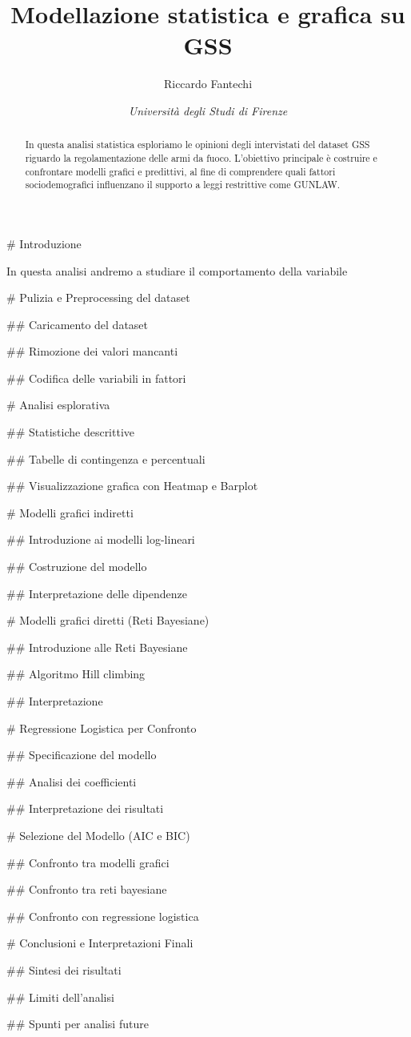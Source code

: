 \documentclass[
  11pt,
]{article}
\title{Modellazione statistica e grafica su GSS}
\author{Riccardo Fantechi}
\date{\textit{Università degli Studi di Firenze}}
\begin{document}
\maketitle

{
\setcounter{tocdepth}{2}
\tableofcontents
}
\begin{center}
\hrulefill
\end{center}

\vspace{0.8em}

\begin{abstract}
In questa analisi statistica esploriamo le opinioni degli intervistati del dataset GSS riguardo la regolamentazione delle armi da fuoco. L’obiettivo principale è costruire e confrontare modelli grafici e predittivi, al fine di comprendere quali fattori sociodemografici influenzano il supporto a leggi restrittive come GUNLAW.
\end{abstract}

\begin{multicols}{2}

# Introduzione

In questa analisi andremo a studiare il comportamento della variabile 

# Pulizia e Preprocessing del dataset

## Caricamento del dataset

## Rimozione dei valori mancanti

## Codifica delle variabili in fattori

# Analisi esplorativa

## Statistiche descrittive

## Tabelle di contingenza e percentuali

## Visualizzazione grafica con Heatmap e Barplot

# Modelli grafici indiretti

## Introduzione ai modelli log-lineari

## Costruzione del modello 

## Interpretazione delle dipendenze

# Modelli grafici diretti (Reti Bayesiane)

## Introduzione alle Reti Bayesiane

## Algoritmo Hill climbing

## Interpretazione

# Regressione Logistica per Confronto

## Specificazione del modello

## Analisi dei coefficienti

## Interpretazione dei risultati

# Selezione del Modello (AIC e BIC)

## Confronto tra modelli grafici

## Confronto tra reti bayesiane

## Confronto con regressione logistica

# Conclusioni e Interpretazioni Finali

## Sintesi dei risultati

## Limiti dell’analisi

## Spunti per analisi future

\end{multicols}
\end{document}
